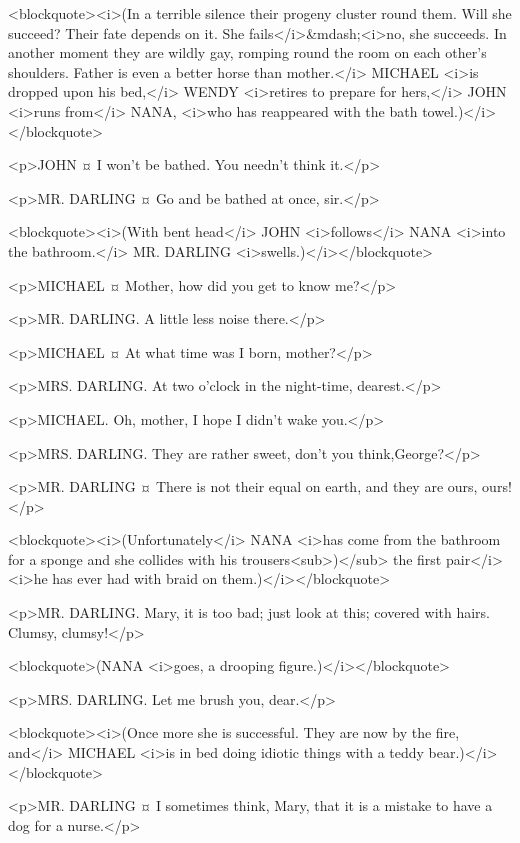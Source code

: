 <blockquote><i>(In a terrible silence their progeny cluster round them. Will she succeed? Their fate depends on it. She fails</i>&mdash;<i>no, she succeeds. In another moment they are wildly gay, romping round the room on each other's shoulders. Father is even a better horse than mother.</i> MICHAEL <i>is dropped upon his bed,</i> WENDY <i>retires to prepare for hers,</i> JOHN <i>runs from</i> NANA, <i>who has reappeared with the bath towel.)</i></blockquote>

<p>JOHN ¤
I won't be bathed. You needn't think it.</p>

<p>MR. DARLING ¤
Go and be bathed at once, sir.</p>

<blockquote><i>(With bent head</i> JOHN <i>follows</i> NANA <i>into the bathroom.</i> MR. DARLING <i>swells.)</i></blockquote>

<p>MICHAEL ¤
Mother, how did you get to know me?</p>

<p>MR. DARLING. A little less noise there.</p>

<p>MICHAEL ¤
At what time was I born, mother?</p>

<p>MRS. DARLING. At two o'clock in the night-time, dearest.</p>

<p>MICHAEL. Oh, mother, I hope I didn't wake you.</p>

<p>MRS. DARLING. They are rather sweet, don't you think,George?</p>

<p>MR. DARLING ¤
There is not their equal on earth, and they are ours, ours!</p>

<blockquote><i>(Unfortunately</i> NANA <i>has come from the bathroom for a sponge and she collides with his trousers<sub>)</sub> the first pair</i> <i>he has ever had with braid on them.)</i></blockquote>

<p>MR. DARLING. Mary, it is too bad; just look at this; covered with hairs. Clumsy, clumsy!</p>

<blockquote>(NANA <i>goes, a drooping figure.)</i></blockquote>

<p>MRS. DARLING. Let me brush you, dear.</p>

<blockquote><i>(Once more she is successful. They are now by the fire, and</i> MICHAEL <i>is in bed doing idiotic things with a teddy bear.)</i></blockquote>

<p>MR. DARLING ¤
I sometimes think, Mary, that it is a mistake to have a dog for a nurse.</p>

